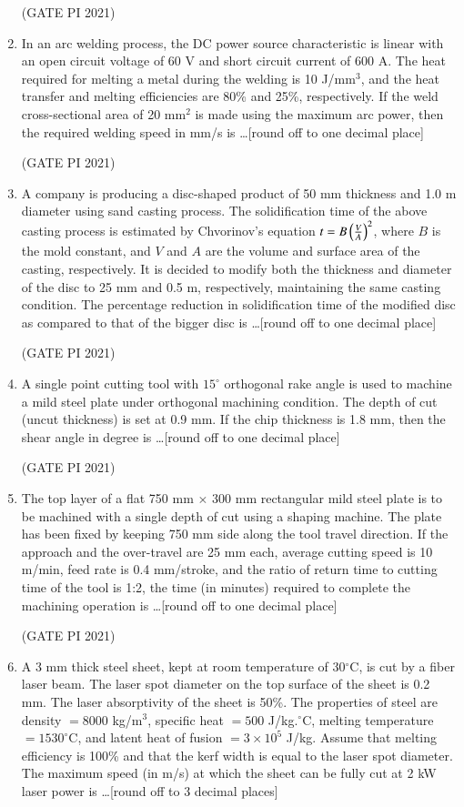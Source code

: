 \documentclass[journal,12pt,onecolumn]{IEEEtran}
\theoremstyle{remark}
\begin{document}
\begin{enumerate}
\hfill (GATE PI 2021)

\item
In an arc welding process, the DC power source characteristic is linear with an open circuit voltage of 60 V and short circuit current of 600 A. The heat required for melting a metal during the welding is 10 J/mm$^3$, and the heat transfer and melting efficiencies are 80\% and 25\%, respectively. If the weld cross-sectional area of 20 mm$^2$ is made using the maximum arc power, then the required welding speed in mm/s is \dots [round off to one decimal place]

\hfill (GATE PI 2021)

\item
A company is producing a disc-shaped product of 50 mm thickness and 1.0 m diameter using sand casting process. The solidification time of the above casting process is estimated by Chvorinov's equation $t = B \left(\frac{V}{A}\right)^2$, where $B$ is the mold constant, and $V$ and $A$ are the volume and surface area of the casting, respectively. It is decided to modify both the thickness and diameter of the disc to 25 mm and 0.5 m, respectively, maintaining the same casting condition. The percentage reduction in solidification time of the modified disc as compared to that of the bigger disc is \dots [round off to one decimal place]

\hfill (GATE PI 2021)

\item
A single point cutting tool with $15^\circ$ orthogonal rake angle is used to machine a mild steel plate under orthogonal machining condition. The depth of cut (uncut thickness) is set at 0.9 mm. If the chip thickness is 1.8 mm, then the shear angle in degree is \dots [round off to one decimal place]

\hfill (GATE PI 2021)

\item
The top layer of a flat 750 mm $\times$ 300 mm rectangular mild steel plate is to be machined with a single depth of cut using a shaping machine. The plate has been fixed by keeping 750 mm side along the tool travel direction. If the approach and the over-travel are 25 mm each, average cutting speed is 10 m/min, feed rate is 0.4 mm/stroke, and the ratio of return time to cutting time of the tool is 1:2, the time (in minutes) required to complete the machining operation is \dots [round off to one decimal place]

\hfill (GATE PI 2021)

\item
A 3 mm thick steel sheet, kept at room temperature of 30$^\circ$C, is cut by a fiber laser beam. The laser spot diameter on the top surface of the sheet is 0.2 mm. The laser absorptivity of the sheet is 50\%. The properties of steel are density $= 8000$ kg/m$^3$, specific heat $= 500$ J/kg.$^\circ$C, melting temperature $= 1530^\circ$C, and latent heat of fusion $= 3\times10^5$ J/kg. Assume that melting efficiency is 100\% and that the kerf width is equal to the laser spot diameter. The maximum speed (in m/s) at which the sheet can be fully cut at 2 kW laser power is \dots [round off to 3 decimal places]


\end{enumerate}
\end{document}
